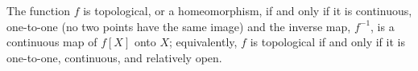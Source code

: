 The function $f$ is topological, or a homeomorphism, if and only if it is continuous, one-to-one (no two points have the same image) and the inverse map, $f^{-1}$, is a continuous map of $f[X]$ onto $X$; equivalently, $f$ is topological if and only if it is one-to-one, continuous, and relatively open.

